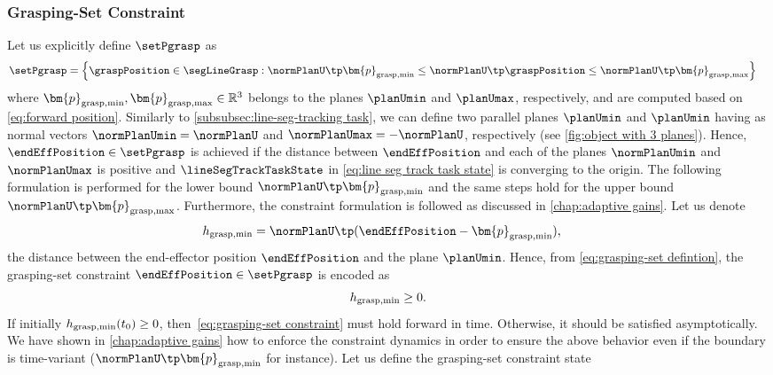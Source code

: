 		\subsubsection{Grasping-Set Constraint}
		 Let us explicitly define $\setPgrasp$ as
		\begin{align}\label{eq:grasping-set defintion}
			\begin{split}
				&\setPgrasp=\left\{\graspPosition\in\segLineGrasp:
				 \normPlanU\tp \bm{p}_{{\rm grasp},\min}\leq \normPlanU\tp \graspPosition \leq \normPlanU\tp \bm{p}_{{\rm grasp},\max} \right\}
			\end{split}
		\end{align} where $\bm{p}_{{\rm grasp},\min},\bm{p}_{{\rm grasp},\max}\in\mathbb{R}^3$ belongs to the planes $\planUmin$ and $\planUmax$, respectively, and  are computed based on \cref{eq:forward position}.
		Similarly to \cref{subsubsec:line-seg-tracking task}, we can define two parallel planes $\planUmin$ and $\planUmin$ having as normal vectors $\normPlanUmin =\normPlanU$ and $\normPlanUmax=-\normPlanU$, respectively (see \cref{fig:object with 3 planes}). Hence, $\endEffPosition\in\setPgrasp$ is achieved if the distance between $\endEffPosition$ and each of the planes $\normPlanUmin$ and $\normPlanUmax$ is positive and $\lineSegTrackTaskState$ in \cref{eq:line seg track task state} is converging to the origin. The following formulation is performed for the lower bound $\normPlanU\tp \bm{p}_{{\rm grasp},\min}$ and the same steps hold for the upper bound $\normPlanU\tp \bm{p}_{{\rm grasp},\max}$. Furthermore, the constraint formulation is followed as discussed in \cref{chap:adaptive gains}. Let us denote 
		\begin{align}
			\begin{split}
				h_{\rm grasp,\min} &= \normPlanU\tp(\endEffPosition-\bm{p}_{{\rm grasp},\min}), %
			\end{split}
		\end{align} 
		the distance between the end-effector position $\endEffPosition$ and the plane $\planUmin$. Hence, from \cref{eq:grasping-set defintion}, the grasping-set constraint $\endEffPosition\in\setPgrasp$ is encoded as 
		\begin{equation}\label{eq:grasping-set constraint}
			h_{\rm grasp,\min}\geq0.
		\end{equation}  
		If initially $h_{\rm grasp,\min}(t_0)\geq0$, then~\eqref{eq:grasping-set constraint} must hold forward in time. Otherwise, it should be satisfied asymptotically. We have shown in \cref{chap:adaptive gains} how to enforce the constraint dynamics in order to ensure the above behavior even if  the boundary is time-variant ($\normPlanU\tp \bm{p}_{{\rm grasp},\min}$ for instance). Let us define the grasping-set constraint state

